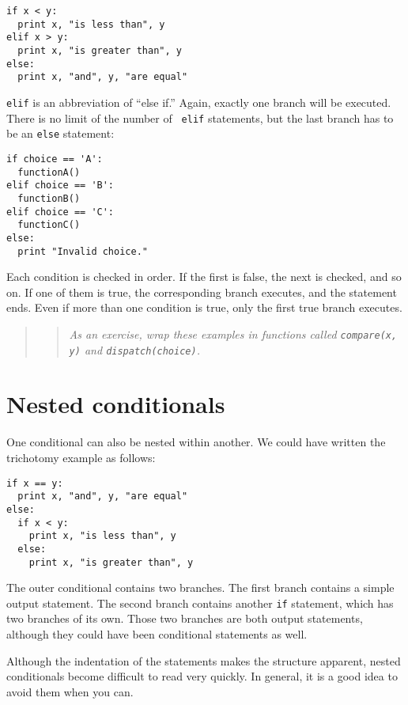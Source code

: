 \beforeverb
\begin{verbatim}
if x < y:
  print x, "is less than", y
elif x > y:
  print x, "is greater than", y
else:
  print x, "and", y, "are equal"
\end{verbatim}
\afterverb
%
{\tt elif} is an abbreviation of ``else if.''  Again, exactly one
branch will be executed.  There is no limit of the number of {\tt
elif} statements, but the last branch has to be an {\tt else}
statement:

\beforeverb
\begin{verbatim}
if choice == 'A':
  functionA()
elif choice == 'B':
  functionB()
elif choice == 'C':
  functionC()
else:
  print "Invalid choice."
\end{verbatim}
\afterverb
%
Each condition is checked in order.  If the first is false,
the next is checked, and so on.  If one of them is
true, the corresponding branch executes, and the statement
ends.  Even if more than one condition is true, only the
first true branch executes.  

\begin{quote}
\begin{quote}
{\em As an exercise, wrap these examples in functions
called {\tt compare(x, y)} and {\tt dispatch(choice)}.}
\end{quote}
\end{quote}


\section{Nested conditionals}

One conditional can also be nested within another.  We could have
written the trichotomy example as follows:

\beforeverb
\begin{verbatim}
if x == y:
  print x, "and", y, "are equal"
else:
  if x < y:
    print x, "is less than", y
  else:
    print x, "is greater than", y
\end{verbatim}
\afterverb
%
The outer conditional contains two branches.  The
first branch contains a simple output statement.  The second branch
contains another {\tt if} statement, which has two branches of its
own.  Those two branches are both output statements,
although they could have been conditional statements as well.

Although the indentation of the statements makes the structure
apparent, nested conditionals become difficult to read very
quickly. In general, it is a good idea to avoid them when you can.

